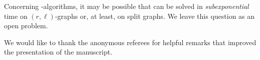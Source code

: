 \documentclass[
final
]{dmtcs-episciences}
\begin{document}
Concerning {}-algorithms, it may be possible that {} can be solved in {\sl subexponential} time on $(r,\ell)$-graphs or, at least, on split graphs. We leave this question as an open problem.



\acknowledgements
\label{sec:ack}
We would like to thank the anonymous referees for helpful remarks that improved the presentation of the manuscript.


	

\label{sec:biblio}
\end{document}
